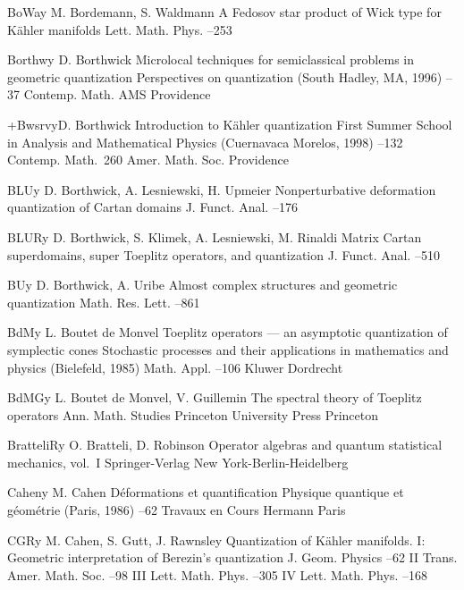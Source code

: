 \documentclass[11pt]{amsart}
\numberwithin{equation}{section}
\theoremstyle{remark}
\newcommand{\by}{\mathbf y}
\begin{document}
\begin{thebibliography}{199}
 BoWa\by{ M. Bordemann, S. Waldmann \paper A Fedosov star product of Wick
type for K\"ahler manifolds \jour Lett. Math. Phys.   --253}

 Borthw\by{ D. Borthwick \paper Microlocal techniques for semiclassical
problems in geometric quantization \inbook Perspectives on quantization (South
Hadley, MA, 1996) --37 \bookinfo Contemp. Math.  \publ AMS
\publaddr Providence }

 +Bwsrv\by{D. Borthwick \paper Introduction to K\"ahler quantization
\inbook First Summer School in Analysis and Mathematical Physics (Cuernavaca
Morelos, 1998) --132 \bookinfo Contemp. Math.~260 \publ Amer. Math.
Soc. \publaddr Providence }

 BLU\by{ D. Borthwick, A. Lesniewski, H. Upmeier \paper Nonperturbative
deformation quantization of Cartan domains \jour J. Funct. Anal.   --176}

 BLUR\by{ D. Borthwick, S. Klimek, A. Lesniewski, M. Rinaldi \paper Matrix
Cartan superdomains, super Toeplitz operators, and quantization \jour J. Funct.
Anal.   --510}

 BU\by{ D. Borthwick, A. Uribe \paper Almost complex structures and
geometric quantization \jour Math. Res. Lett.   --861}

 BdM\by{ L. Boutet de Monvel \paper Toeplitz operators --- an asymptotic
quantization of symplectic cones \inbook Stochastic processes and their
applications in mathematics and physics (Bielefeld, 1985) \bookinfo Math. Appl.
 --106 \publ Kluwer \publaddr Dordrecht }

 BdMG\by{ L. Boutet de Monvel, V. Guillemin \book The spectral theory
of Toeplitz operators \bookinfo Ann. Math. Studies  \publ Princeton
University Press \publaddr Princeton }

 BratteliR\by{ O. Bratteli, D. Robinson \book Operator algebras and
quantum statistical mechanics, vol.~I \publ Springer-Verlag \publaddr New
York-Berlin-Heidelberg }

 Cahen\by{ M. Cahen \paper D\'eformations et quantification \inbook
Physique quantique et g\'eom\'etrie (Paris, 1986) --62 \bookinfo
Travaux en Cours  \publ Hermann \publaddr Paris }

 CGR\by{ M. Cahen, S. Gutt, J. Rawnsley \paper Quantization of
K\"ahler manifolds. I: Geometric interpretation of Berezin's quantization
\jour J. Geom. Physics  --62  \moreref \paper II \jour
Trans. Amer. Math. Soc.  --98  \moreref \paper III
\jour Lett. Math. Phys.  --305  \moreref \paper
IV \jour Lett. Math. Phys.   --168}


\end{thebibliography}
\end{document}
